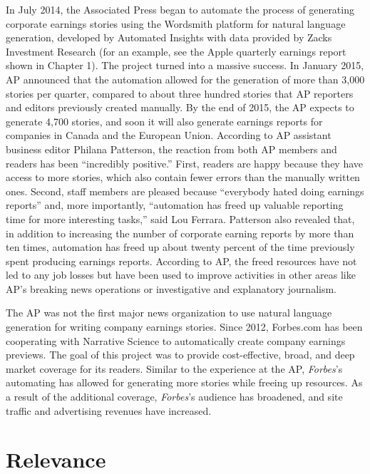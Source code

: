 \documentclass[notoc, symmetric, nobib, nols]{towcenter-book}
\begin{document}
In July 2014, the Associated Press began to automate the process of generating corporate earnings stories using the Wordsmith platform for natural language generation, developed by Automated Insights with data provided by Zacks Investment Research (for an example, see the Apple quarterly earnings report shown in Chapter 1). The project turned into a massive success. In January 2015, AP announced that the automation allowed for the generation of more than 3,000 stories per quarter, compared to about three hundred stories that AP reporters and editors previously created manually. By the end of 2015, the AP expects to generate 4,700 stories, and soon it will also generate earnings reports for companies in Canada and the European Union. According to AP assistant business editor Philana Patterson, the reaction from both AP members and readers has been ``incredibly positive.''\cite{white15} First, readers are happy because they have access to more stories, which also contain fewer errors than the manually written ones. Second, staff members are pleased because ``everybody hated doing earnings reports'' and, more importantly, ``automation has freed up valuable reporting time for more interesting tasks,'' said Lou Ferrara. Patterson also revealed that, in addition to increasing the number of corporate earning reports by more than ten times, automation has freed up about twenty percent of the time previously spent producing earnings reports. According to AP, the freed resources have not led to any job losses but have been used to improve activities in other areas like AP’s breaking news operations or investigative and explanatory journalism.\cite{white15}  

The AP was not the first major news organization to use natural language generation for writing company earnings stories. Since 2012, Forbes.com has been cooperating with Narrative Science to automatically create company earnings previews. The goal of this project was to provide cost-effective, broad, and deep market coverage for its readers. Similar to the experience at the AP, \textit{Forbes}’s automating has allowed for generating more stories while freeing up resources. As a result of the additional coverage, \textit{Forbes}’s audience has broadened, and site traffic and advertising revenues have increased.\cite{ns13}

\section{Relevance}
\end{document}
